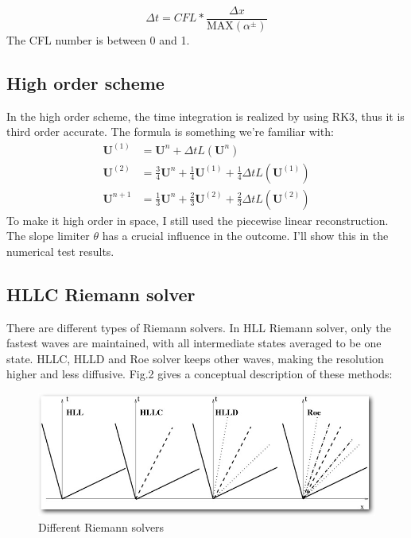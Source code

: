 \documentclass[11pt, oneside]{article}   	%
\begin{document}
\begin{equation}
    \Delta t = CFL * \frac{\Delta x}{ \mathrm { MAX } ( \alpha ^ { \pm })} 
\end{equation}
The CFL number is between 0 and 1.

\subsection{High order scheme}
In the high order scheme, the time integration is realized by using RK3, thus it is third order accurate. The formula is something we're familiar with:
\begin{equation}
    \begin{aligned} \mathbf { U } ^ { ( 1 ) } & = \mathbf { U } ^ { n } + \Delta t L \left( \mathbf { U } ^ { n } \right) \\ \mathbf { U } ^ { ( 2 ) } & = \frac { 3 } { 4 } \mathbf { U } ^ { n } + \frac { 1 } { 4 } \mathbf { U } ^ { ( 1 ) } + \frac { 1 } { 4 } \Delta t L \left( \mathbf { U } ^ { ( 1 ) } \right) \\ \mathbf { U } ^ { n + 1 } & = \frac { 1 } { 3 } \mathbf { U } ^ { n } + \frac { 2 } { 3 } \mathbf { U } ^ { ( 2 ) } + \frac { 2 } { 3 } \Delta t L \left( \mathbf { U } ^ { ( 2 ) } \right) \end{aligned}
\end{equation}
To make it high order in space, I still used the piecewise linear reconstruction. The slope limiter $\theta $ has a crucial influence in the outcome. I'll show this in the numerical test results.

\subsection{HLLC Riemann solver}
There are different types of Riemann solvers. In HLL Riemann solver, only the fastest waves are maintained, with all intermediate states averaged to be one state. HLLC, HLLD and Roe solver keeps other waves, making the resolution higher and less diffusive. Fig.2 gives a conceptual description of these methods:

\begin{figure}[H]
\centering
\includegraphics[scale = 0.4]{riemann_solvers.png}
\caption{Different Riemann solvers}
\end{figure}
\end{document}
